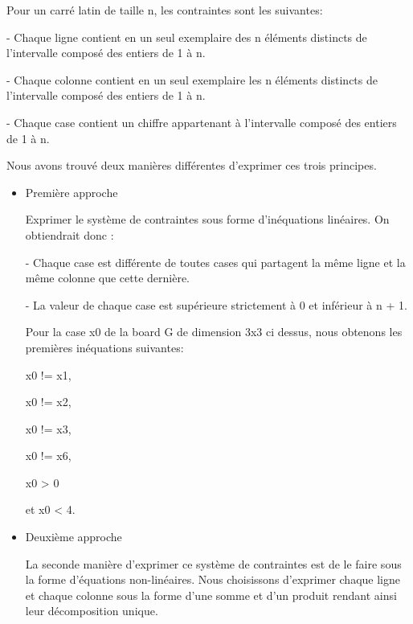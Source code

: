 \documentclass[1]{report}
\begin{document}
    Pour un carré latin de taille n, les contraintes sont les suivantes: \newline
    
    - Chaque ligne contient en un seul exemplaire des n éléments distincts de l'intervalle composé des entiers de 1 à n.
    
    - Chaque colonne contient en un seul exemplaire les n éléments distincts de l'intervalle composé des entiers de 1 à n.
    
    - Chaque case contient un chiffre appartenant à l'intervalle composé des entiers de 1 à n. \newline

    Nous avons trouvé deux manières différentes d'exprimer ces trois principes. \newline
    
    \begin{itemize}
        \item{Première approche} \newline
        
        Exprimer le système de contraintes sous forme d'inéquations linéaires. On obtiendrait donc : \newline
        
        - Chaque case est différente de toutes cases qui partagent la même ligne et la même colonne que cette dernière.
        
        - La valeur de chaque case est supérieure strictement à 0 et inférieur à \newline n + 1. \newline

        Pour la case x0 de la board G de dimension 3x3 ci dessus, nous obtenons les premières inéquations suivantes: \newline
        
        x0 != x1, 
        
        x0 != x2, 
        
        x0 != x3, 
        
        x0 != x6, 
        
        x0 > 0 
        
        et x0 < 4. \newline
        
        \item{Deuxième approche} \newline
    
        La seconde manière d'exprimer ce système de contraintes est de le faire sous la forme d'équations non-linéaires. Nous choisissons d'exprimer chaque ligne et chaque colonne sous la forme d'une somme et d'un produit rendant ainsi leur décomposition unique. \newline
        

\end{itemize}
\end{document}
